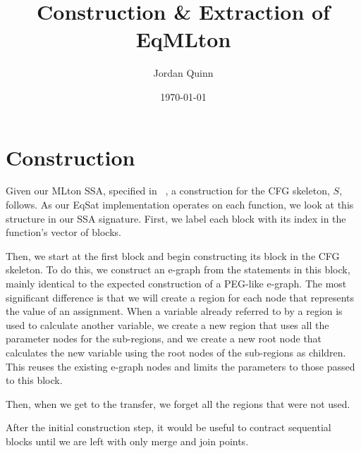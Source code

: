 \documentclass{article}
\title{Construction \& Extraction of EqMLton}
\author{Jordan Quinn}
\date{\today}
\begin{document}
\maketitle


\section{Construction}

Given our MLton SSA, specified in ~\cite{MLtonSSA}, a construction for the CFG skeleton, $S$, follows. As our EqSat implementation operates on each function, we look at this structure in our SSA signature. First, we label each block with its index in the function's vector of blocks.

Then, we start at the first block and begin constructing its block in the CFG skeleton. To do this, we construct an e-graph from the statements in this block, mainly identical to the expected construction of a PEG-like e-graph. The most significant difference is that we will create a region for each node that represents the value of an assignment. When a variable already referred to by a region is used to calculate another variable, we create a new region that uses all the parameter nodes for the sub-regions, and we create a new root node that calculates the new variable using the root nodes of the sub-regions as children. This reuses the existing e-graph nodes and limits the parameters to those passed to this block.

Then, when we get to the transfer, we forget all the regions that were not used.

After the initial construction step, it would be useful to contract sequential blocks until we are left with only merge and join points.
\end{document}
